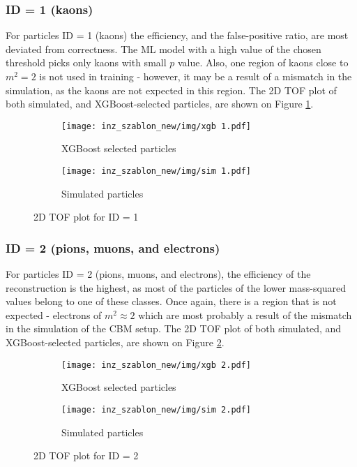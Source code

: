 \subsubsection{ID = 1 (kaons)}
For particles ID = 1 (kaons) the efficiency, and the false-positive ratio, are  most deviated from correctness. The ML model with a high value of the chosen threshold picks only kaons with small $p$ value. Also, one region of kaons close to $m^2 = 2$ is not used in training - however, it may be a result of a mismatch in the simulation, as the kaons are not expected in this region. The 2D TOF plot of both simulated, and XGBoost-selected particles, are shown on Figure \ref{2D TOF id1}.
\begin{figure}[H]
 \centering
    \begin{subfigure}[b]{0.8\linewidth} 
        \centering
        \texttt{[image: inz\_szablon\_new/img/xgb 1.pdf]}
        \caption{XGBoost selected particles}
        \vspace{0.3cm}
    \end{subfigure}
     \hfill
       \begin{subfigure}[b]{0.8\linewidth}
        \centering
        \texttt{[image: inz\_szablon\_new/img/sim 1.pdf]}
        \caption{Simulated particles}
        \vspace{0.3cm}
    \end{subfigure}
    \caption{2D TOF plot for ID = 1}
     \label{2D TOF id1}
\end{figure}
\clearpage

\subsubsection{ID = 2 (pions, muons, and electrons)}
For particles ID = 2 (pions, muons, and electrons), the efficiency of the reconstruction is the highest, as most of the particles of the lower mass-squared values belong to one of these classes. Once again, there is a region that is not expected - electrons of $m^2 \approx 2$ which are most probably a result of the mismatch in the simulation of the CBM setup. The 2D TOF plot of both simulated, and XGBoost-selected particles, are shown on Figure \ref{2D TOF id2}.
\begin{figure}[H]
 \centering
    \begin{subfigure}[b]{0.8\linewidth} 
        \centering
        \texttt{[image: inz\_szablon\_new/img/xgb 2.pdf]}
        \caption{XGBoost selected particles}
        \vspace{0.3cm}
    \end{subfigure}
     \hfill
       \begin{subfigure}[b]{0.8\linewidth}
        \centering
        \texttt{[image: inz\_szablon\_new/img/sim 2.pdf]}
        \caption{Simulated particles}
        \vspace{0.3cm}
    \end{subfigure}
    \caption{2D TOF plot for ID = 2}
     \label{2D TOF id2}
\end{figure}
\clearpage


